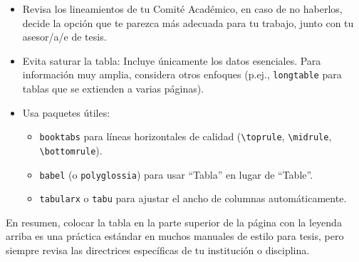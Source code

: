 \documentclass{article}
\begin{document}
\begin{itemize}
  \item Revisa los lineamientos de tu Comité Académico, en caso de no haberlos, decide la opción que te parezca más adecuada para tu trabajo, junto con tu asesor/a/e de tesis.


  \item Evita saturar la tabla: Incluye únicamente los datos esenciales. Para 
  información muy amplia, considera otros enfoques (p.ej., \texttt{longtable} para 
  tablas que se extienden a varias páginas).

  \item Usa paquetes útiles:
    \begin{itemize}
      \item \texttt{booktabs} para líneas horizontales de calidad (\texttt{\textbackslash toprule}, 
      \texttt{\textbackslash midrule}, \texttt{\textbackslash bottomrule}).
      \item \texttt{babel} (o \texttt{polyglossia}) para usar “Tabla” en lugar de “Table”.
      \item \texttt{tabularx} o \texttt{tabu} para ajustar el ancho de columnas 
      automáticamente.
    \end{itemize}

\end{itemize}

En resumen, colocar la tabla en la parte superior de la página con la leyenda arriba 
es una práctica estándar en muchos manuales de estilo para tesis, pero siempre revisa 
las directrices específicas de tu institución o disciplina.
\end{document}
